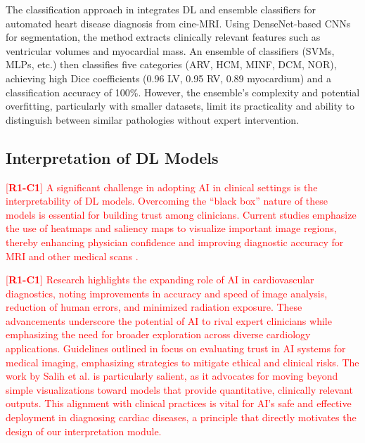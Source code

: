 \documentclass[fleqn,10pt]{wlscirep}
\newcommand{\revtag}[2]{[\textbf{R#1-C#2}]}
\newcommand{\Rone}[1]{\textcolor{red}{#1}}
\begin{document}
The classification approach in \cite{Khened:2019} integrates DL and ensemble classifiers for automated heart disease diagnosis from cine-MRI. Using DenseNet-based CNNs for segmentation, the method extracts clinically relevant features such as ventricular volumes and myocardial mass. An ensemble of classifiers (SVMs, MLPs, etc.) then classifies five categories (ARV, HCM, MINF, DCM, NOR), achieving high Dice coefficients (0.96 LV, 0.95 RV, 0.89 myocardium) and a classification accuracy of 100\%. However, the ensemble's complexity and potential overfitting, particularly with smaller datasets, limit its practicality and ability to distinguish between similar pathologies without expert intervention.

\subsection*{Interpretation of DL Models}

\Rone{\revtag{1}{1} A significant challenge in adopting AI in clinical settings is the interpretability of DL models. Overcoming the ``black box'' nature of these models is essential for building trust among clinicians. Current studies emphasize the use of heatmaps and saliency maps to visualize important image regions, thereby enhancing physician confidence and improving diagnostic accuracy for MRI and other medical scans \cite{Watanabe:2022}.}

\Rone{\revtag{1}{1} Research \cite{Ali:2024} highlights the expanding role of AI in cardiovascular diagnostics, noting improvements in accuracy and speed of image analysis, reduction of human errors, and minimized radiation exposure. These advancements underscore the potential of AI to rival expert clinicians while emphasizing the need for broader exploration across diverse cardiology applications. Guidelines outlined in \cite{Szabo:2022,Salih:2023} focus on evaluating trust in AI systems for medical imaging, emphasizing strategies to mitigate ethical and clinical risks. The work by Salih et al. \cite{Salih:2023} is particularly salient, as it advocates for moving beyond simple visualizations toward models that provide quantitative, clinically relevant outputs. This alignment with clinical practices is vital for AI's safe and effective deployment in diagnosing cardiac diseases, a principle that directly motivates the design of our interpretation module.}
\end{document}
